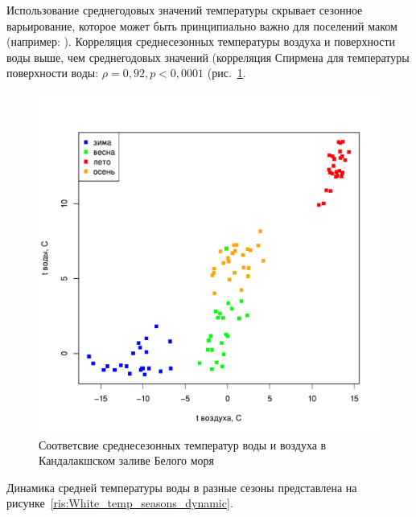 Использование среднегодовых значений температуры скрывает сезонное варьирование, которое может быть принципиально важно для поселений маком (например: \cite{Beukema_et_al_1998, Beukema_Dekker_2003, Beukema_et_al_2009}). 
Корреляция среднесезонных температуры воздуха и поверхности воды выше, чем среднегодовых значений (корреляция Спирмена для температуры поверхности воды: $\rho = 0,92, p < 0,0001$ (рис.~\ref{ris:White_temp_water_vs_air_seasons}. 
	\begin{figure}
    \includegraphics[width=\textwidth]{../temperatures_water_air/temp_air_water1.pdf}
    \caption{Соответсвие среднесезонных температур воды и воздуха в Кандалакшском заливе Белого моря}
    \label{ris:White_temp_water_vs_air_seasons}
	\end{figure}
Динамика средней температуры воды в разные сезоны представлена на рисунке~\ref{ris:White_temp_seasons_dynamic}.
